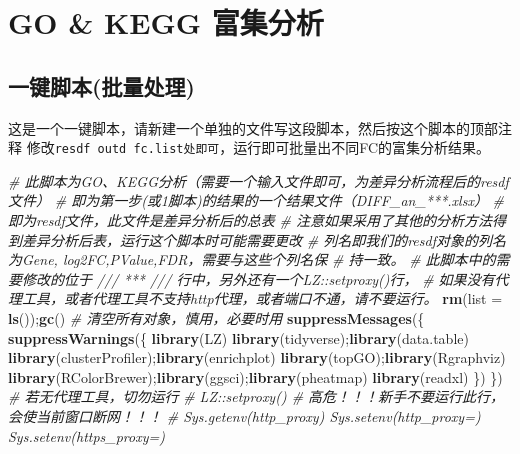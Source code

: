 \documentclass[
]{book}
\newenvironment{Shaded}{\begin{snugshade}}{\end{snugshade}}
\newcommand{\AttributeTok}[1]{\textcolor[rgb]{0.13,0.29,0.53}{#1}}
\newcommand{\CommentTok}[1]{\textcolor[rgb]{0.56,0.35,0.01}{\textit{#1}}}
\newcommand{\FunctionTok}[1]{\textcolor[rgb]{0.13,0.29,0.53}{\textbf{#1}}}
\newcommand{\NormalTok}[1]{#1}
\begin{document}
\section{GO \& KEGG 富集分析}\label{enrich-auto}

\subsection{一键脚本(批量处理)}\label{ux4e00ux952eux811aux672cux6279ux91cfux5904ux7406}

这是一个一键脚本，请新建一个单独的文件写这段脚本，然后按这个脚本的顶部注释
修改\texttt{resdf\ outd\ fc.list处即可}，运行即可批量出不同FC的富集分析结果。

\begin{Shaded}
\begin{Highlighting}[]
\CommentTok{\# 此脚本为GO、KEGG分析（需要一个输入文件即可，为差异分析流程后的resdf文件）}
\CommentTok{\# 即为第一步(或1脚本)的结果的一个结果文件（DIFF\_an\_***.xlsx）}
\CommentTok{\# 即为resdf文件，此文件是差异分析后的总表}
\CommentTok{\# 注意如果采用了其他的分析方法得到差异分析后表，运行这个脚本时可能需要更改}
\CommentTok{\# 列名即我们的resdf对象的列名为Gene, log2FC,PValue,FDR，需要与这些个列名保}
\CommentTok{\# 持一致。}
\CommentTok{\# 此脚本中的需要修改的位于 /// *** /// 行中，另外还有一个LZ::setproxy()行，}
\CommentTok{\#   如果没有代理工具，或者代理工具不支持http代理，或者端口不通，请不要运行。}
\FunctionTok{rm}\NormalTok{(}\AttributeTok{list =} \FunctionTok{ls}\NormalTok{());}\FunctionTok{gc}\NormalTok{() }\CommentTok{\# 清空所有对象，慎用，必要时用}
\FunctionTok{suppressMessages}\NormalTok{(\{ }\FunctionTok{suppressWarnings}\NormalTok{(\{}
  \FunctionTok{library}\NormalTok{(LZ)}
  \FunctionTok{library}\NormalTok{(tidyverse);}\FunctionTok{library}\NormalTok{(data.table)}
  \FunctionTok{library}\NormalTok{(clusterProfiler);}\FunctionTok{library}\NormalTok{(enrichplot)}
  \FunctionTok{library}\NormalTok{(topGO);}\FunctionTok{library}\NormalTok{(Rgraphviz)}
  \FunctionTok{library}\NormalTok{(RColorBrewer);}\FunctionTok{library}\NormalTok{(ggsci);}\FunctionTok{library}\NormalTok{(pheatmap)}
  \FunctionTok{library}\NormalTok{(readxl)}
\NormalTok{\}) \})}
\CommentTok{\# 若无代理工具，切勿运行 }
\CommentTok{\# LZ::setproxy() \# 高危！！！新手不要运行此行，会使当前窗口断网！！！}
\CommentTok{\# Sys.getenv(\textquotesingle{}http\_proxy\textquotesingle{}) Sys.setenv(\textquotesingle{}http\_proxy\textquotesingle{}=\textquotesingle{}\textquotesingle{}) Sys.setenv(\textquotesingle{}https\_proxy\textquotesingle{}=\textquotesingle{}\textquotesingle{})}


\end{Highlighting}
\end{Shaded}
\end{document}
